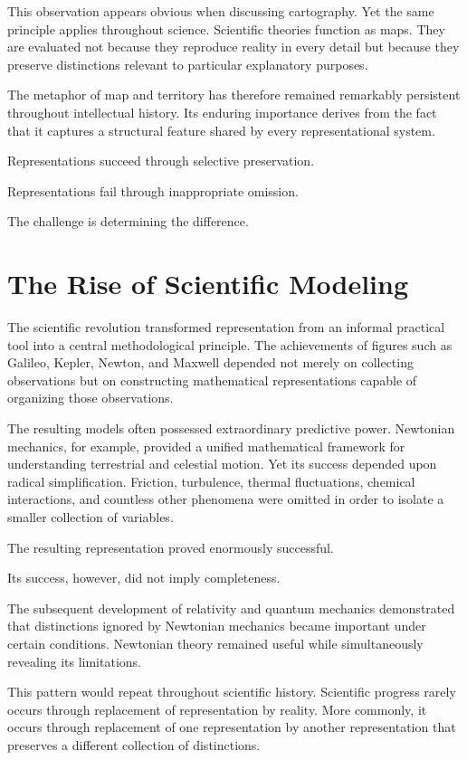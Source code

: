 \documentclass[11pt,oneside,openany]{book}
\begin{document}
This observation appears obvious when discussing cartography. Yet the same principle applies throughout science. Scientific theories function as maps. They are evaluated not because they reproduce reality in every detail but because they preserve distinctions relevant to particular explanatory purposes.

The metaphor of map and territory has therefore remained remarkably persistent throughout intellectual history. Its enduring importance derives from the fact that it captures a structural feature shared by every representational system.

Representations succeed through selective preservation.

Representations fail through inappropriate omission.

The challenge is determining the difference.

\section{The Rise of Scientific Modeling}

The scientific revolution transformed representation from an informal practical tool into a central methodological principle. The achievements of figures such as Galileo, Kepler, Newton, and Maxwell depended not merely on collecting observations but on constructing mathematical representations capable of organizing those observations.

The resulting models often possessed extraordinary predictive power. Newtonian mechanics, for example, provided a unified mathematical framework for understanding terrestrial and celestial motion. Yet its success depended upon radical simplification. Friction, turbulence, thermal fluctuations, chemical interactions, and countless other phenomena were omitted in order to isolate a smaller collection of variables.

The resulting representation proved enormously successful.

Its success, however, did not imply completeness.

The subsequent development of relativity and quantum mechanics demonstrated that distinctions ignored by Newtonian mechanics became important under certain conditions. Newtonian theory remained useful while simultaneously revealing its limitations.

This pattern would repeat throughout scientific history. Scientific progress rarely occurs through replacement of representation by reality. More commonly, it occurs through replacement of one representation by another representation that preserves a different collection of distinctions.
\end{document}

